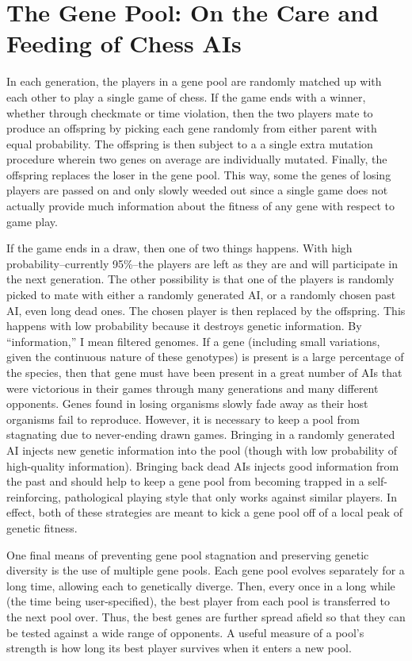 \documentclass[letterpaper]{article}
\renewcommand{\_}{\allowbreak\textunderscore\allowbreak}
\begin{document}
\section{The Gene Pool: On the Care and Feeding of Chess AIs}

In each generation, the players in a gene pool are randomly matched up with each other to play a single game of chess. If the game ends with a winner, whether through checkmate or time violation, then the two players mate to produce an offspring by picking each gene randomly from either parent with equal probability. The offspring is then subject to a a single extra mutation procedure wherein two genes on average are individually mutated. Finally, the offspring replaces the loser in the gene pool. This way, some the genes of losing players are passed on and only slowly weeded out since a single game does not actually provide much information about the fitness of any gene with respect to game play.

If the game ends in  a draw, then one of two things happens. With high probability--currently 95\%--the players are left as they are and will participate in the next generation. The other possibility is that one of the players is randomly picked to mate with either a randomly generated AI, or a randomly chosen past AI, even long dead ones. The chosen player is then replaced by the offspring. This happens with low probability because it destroys genetic information. By ``information,'' I mean filtered genomes. If a gene (including small variations, given the continuous nature of these genotypes) is present is a large percentage of the species, then that gene must have been present in a great number of AIs that were victorious in their games through many generations and many different opponents. Genes found in losing organisms slowly fade away as their host organisms fail to reproduce. However, it is necessary to keep a pool from stagnating due to never-ending drawn games. Bringing in a randomly generated AI injects new genetic information into the pool (though with low probability of high-quality information). Bringing back dead AIs injects good information from the past and should help to keep a gene pool from becoming trapped in a self-reinforcing, pathological playing style that only works against similar players. In effect, both of these strategies are meant to kick a gene pool off of a local peak of genetic fitness.

One final means of preventing gene pool stagnation and preserving genetic diversity is the use of multiple gene pools. Each gene pool evolves separately for a long time, allowing each to genetically diverge. Then, every once in a long while (the time being user-specified), the best player from each pool is transferred to the next pool over. Thus, the best genes are further spread afield so that they can be tested against a wide range of opponents. A useful measure of a pool's strength is how long its best player survives when it enters a new pool.
\end{document}
